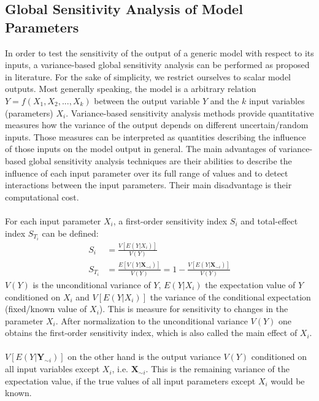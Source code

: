 \documentclass[11pt]{article}
\begin{document}
\subsection{Global Sensitivity Analysis of Model Parameters}
In order to test the sensitivity of the output of a generic model with respect to its inputs, a variance-based global sensitivity analysis can be performed as proposed in literature. For the sake of simplicity, we restrict ourselves to scalar model outputs. Most generally speaking, the model is a arbitrary relation $Y = f(X_1,X_2,...,X_k)$ between the output variable $Y$ and the $k$ input variables (parameters) $X_i$. Variance-based sensitivity analysis methods provide quantitative measures how the variance of the output depends on different uncertain/random inputs. Those measures can be interpreted as quantities describing the influence of those inputs on the model output in general. The main advantages of variance-based global sensitivity analysis techniques are their abilities to describe the influence of each input parameter over its full range of values and to detect interactions between the input parameters. Their main disadvantage is their computational cost.\\
\\
For each input parameter $X_i$, a first-order sensitivity index $S_i$ and total-effect index $S_{T_i}$ can be defined:
\begin{align}
S_i &= \frac{V[E(Y|X_i)]}{V(Y)} \label{eqn:first_order}\\
S_{T_i} &= \frac{E[V(Y|\textbf{X}_{\sim i})]}{V(Y)} = 1 - \frac{V[E(Y|\textbf{X}_{\sim i})]}{V(Y)} \label{eqn:total_effect}
\end{align}
$V(Y)$ is the unconditional variance of $Y$, $E(Y|X_i)$ the expectation value of $Y$ conditioned on $X_i$ and $V[E(Y|X_i)]$ the variance of the conditional expectation (fixed/known value of $X_i$). This is measure for sensitivity to changes in the parameter $X_i$. After normalization to the unconditional variance $V(Y)$ one obtains the first-order sensitivity index, which is also called the main effect of $X_i$.\\
\\
$V[E(Y|\textbf{Y}_{\sim i})]$ on the other hand is the output variance $V(Y)$ conditioned on all input variables except $X_i$, i.e. $\textbf{X}_{\sim i}$. This is the remaining variance of the expectation value, if the true values of all input parameters except $X_i$ would be known.\\
\\
\end{document}
